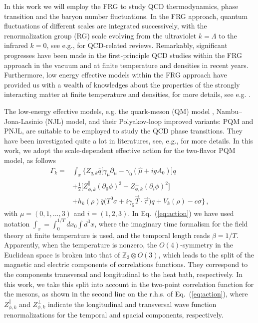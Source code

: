 \documentclass[%
reprint,
superscriptaddress,
showpacs,preprintnumbers,
 amsmath,amssymb,
 aps,
prd,
]{revtex4-1}
\def\Eq#1{Eq.~(\ref{#1})}
\begin{document}
In this work we will employ the FRG to study QCD thermodynamics, phase transition and the baryon number fluctuations. In the FRG approach, quantum fluctuations of different scales are integrated successively, with the renormalization group (RG) scale evolving from the ultraviolet $k=\Lambda$ to the infrared $k=0$, see e.g., \cite{Berges:2000ew,Pawlowski:2005xe,Pawlowski:2010ht,Braun:2011pp} for QCD-related reviews. Remarkably, significant progresses have been made in the first-principle QCD studies within the FRG approach in the vacuum \cite{Mitter:2014wpa,Braun:2014ata,Rennecke:2015eba,Cyrol:2016tym,Cyrol:2017ewj,Cyrol:2017qkl} and at finite temperature and densities \cite{Fu:2019a} in recent years. Furthermore, low energy effective models within the FRG approach have provided us with a wealth of knowledges about the properties of the strongly interacting matter at finite temperature and densities, for more details, see e.g. \cite{Schaefer:2004en,Schaefer:2006sr,Skokov:2010wb,Herbst:2010rf,Schaefer:2011ex,Mitter:2013fxa,Herbst:2013ufa,Tripolt:2013jra,Fu:2015naa,Fu:2015amv,Fu:2016tey,Rennecke:2016tkm,Jung:2016yxl,Braun:2017srn,Fu:2018qsk,Fu:2018swz,Sun:2018ozp,Wen:2018nkn,Li:2019nzj}.

The low-energy effective models, e.g. the quark-meson (QM) model \cite{Schaefer:2004en}, Nambu--Jona-Lasinio (NJL) model, and their Polyakov-loop improved variants: PQM and PNJL, are suitable to be employed to study the QCD phase transitions. They have been investigated quite a lot in literatures, see, e.g., \cite{Fukushima:2003fw,Ratti:2005jh,Fu:2007xc,Schaefer:2007pw,Fu:2009wy,Fu:2010ay} for more details. In this work, we adopt the scale-dependent effective action for the two-flavor PQM model, as follows 
\begin{align}
\Gamma_k=&\int_x \bigg\{Z_{q,k}\bar{q} \Big [\gamma_\mu \partial_\mu -\gamma_0(\hat\mu+igA_0) \Big ]q \nonumber\\[2ex]
&+\frac{1}{2}\Big [Z_{\phi,k}^{\parallel}(\partial_0 \phi)^2+Z_{\phi,k}^{\perp}(\partial_i \phi)^2 \Big]\nonumber\\[2ex]
&+h_k(\rho)\bar{q}\big(T^0\sigma+i\gamma_5\vec{T}\cdot \vec{\pi}\big)q+V_k(\rho)-c\sigma \bigg\}\,,\label{eq:action}
\end{align}
with $\mu=(0, 1, ..., 3)$ and $i=(1, 2, 3)$. In \Eq{eq:action} we have used notation $\int_{x}=\int_0^{1/T}d x_0 \int d^3 x$, where the imaginary time formalism for the field theory at finite temperature is used, and the temporal length reads $\beta=1/T$. Apparently, when the temperature is nonzero, the $O(4)$-symmetry in the Euclidean space is broken into that of $\mathbb{Z}_2\otimes O(3)$, which leads to the split of the magnetic and electric components of correlations functions. They correspond to the components transversal and longitudinal to the heat bath, respectively. In this work, we take this split into account in the two-point correlation function for the mesons, as shown in the second line on the r.h.s. of \Eq{eq:action}, where $Z_{\phi,k}^{\parallel}$ and $Z_{\phi,k}^{\perp}$ indicate the longitudinal and transversal wave function renormalizations for the temporal and spacial components, respectively. 
\end{document}
